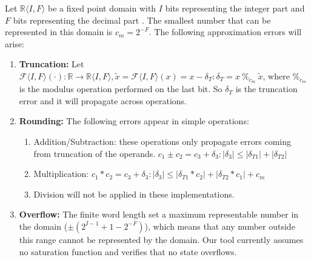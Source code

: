 \documentclass[runningheads,a4paper]{llncs}
\begin{document}
Let $\mathbb{R} \langle I,F \rangle$  be a fixed point domain with $I$ bits representing the integer part 
and $F$ bits representing the decimal part . The smallest number that can be represented in this domain is $c_m=2^{-F}$.
The following approximation errors will arise:
\begin{enumerate}
\item {\bf Truncation:}
Let $\mathcal{F}\langle I,F \rangle(\cdot) : \mathbb{R} \rightarrow \mathbb{R}\langle I,F \rangle, \tilde x=\mathcal{F}\langle I,F \rangle(x) = x-\delta_T : \delta_T=x\ \%_{c_m}\ \tilde x$, where $\%_{c_m}$ is the modulus operation performed on the last bit.
So $\delta_T$ is the truncation error and it will propagate across operations.
\item {\bf Rounding:}
The following errors appear in simple operations:
\begin{enumerate}
\item Addition/Subtraction: these operations only propagate errors coming from truncation of the operands. 
$c_1\pm c_2= c_3 + \delta_3 :|\delta_3| \leq |\delta_{T1}| + |\delta_{T2}|$ 
\item Multiplication: $c_1 * c_2= c_3 + \delta_3 :|\delta_3| \leq |\delta_{T1}*c_2| + |\delta_{T2}*c_1| + c_m$  
\item Division will not be applied in these implementations. 
\end{enumerate}

\item {\bf Overflow:}
  The finite word length set a
maximum representable number in the domain  ($\pm (2^{I-1}+1-2^{-F})$), which means that any number outside this range
cannot be represented by the domain. Our tool currently assumes no saturation
function and verifies that no state overflows.
\end{enumerate}

\end{document}
